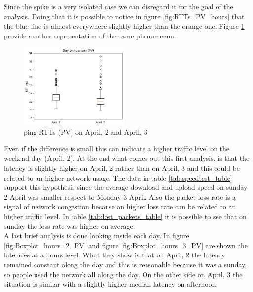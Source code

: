 \documentclass[a4paper,10pt]{article}
\begin{document}
\begin{multicols}{2}
\noindent
Since the spike is a very isolated case we can disregard it for the goal of the analysis. Doing that it is possible to notice in figure \ref{fig:RTTs_PV_hours}
that the blue line is almost everywhere slightly higher than the orange one. Figure \ref{fig:Boxplot_full_PV} provide another representation of the same phenomenon.

        \begin{figure}[H]
                \centering
                \includegraphics[width=0.48\textwidth]{Boxplot_full_PV_nospike.png}
                \caption{\small ping RTTs (PV) on April, 2 and April, 3}
                \label{fig:Boxplot_full_PV}
        \end{figure}

\noindent
Even if the difference is small this can indicate a higher traffic level on the weekend day (April, 2).
At the end what comes out this first analysis, is that the latency is slightly higher on April, 2 rather than on April, 3 and this could be related
to an higher network usage. The data in table \ref{tab:speedtest_table} support this hypothesis since the average download and upload speed on sunday 2 April
was smaller respect to Monday 3 April. Also the packet loss rate is a signal of network congestion because an higher loss rate can be related to an higher traffic level.
In table \ref{tab:lost_packets_table} it is possible to see that on sunday the loss rate was higher on average.\\
A last brief analysis is done looking inside each day. In figure \ref{fig:Boxplot_hours_2_PV} and figure \ref{fig:Boxplot_hours_3_PV} are shown the latencies 
at a hours level. What they show is that on April, 2 the latency remained constant along the day and this is reasonable because it was a sunday, so people 
used the network all along the day. On the other side on April, 3 the situation is similar with a slightly higher median latency on afternoon.


\end{multicols}
\end{document}
